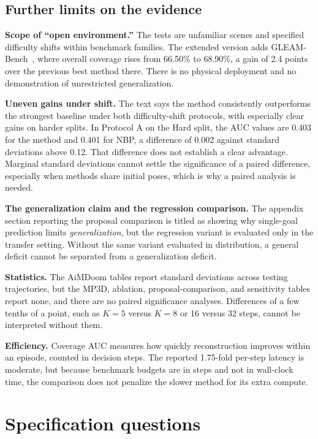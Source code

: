 \documentclass[11pt]{article}
\theoremstyle{plain}
\theoremstyle{remark}
\begin{document}
\subsection{Further limits on the evidence}

\textbf{Scope of ``open environment.''} The tests are unfamiliar scenes and specified difficulty shifts within benchmark families. The extended version adds GLEAM-Bench~\cite{gleam2025}, where overall coverage rises from 66.50\% to 68.90\%, a gain of 2.4 points over the previous best method there. There is no physical deployment and no demonstration of unrestricted generalization.

\textbf{Uneven gains under shift.} The text says the method consistently outperforms the strongest baseline under both difficulty-shift protocols, with especially clear gains on harder splits. In Protocol A on the Hard split, the AUC values are 0.403 for the method and 0.401 for NBP, a difference of 0.002 against standard deviations above 0.12. That difference does not establish a clear advantage. Marginal standard deviations cannot settle the significance of a paired difference, especially when methods share initial poses, which is why a paired analysis is needed.

\textbf{The generalization claim and the regression comparison.} The appendix section reporting the proposal comparison is titled as showing why single-goal prediction limits \emph{generalization}, but the regression variant is evaluated only in the transfer setting. Without the same variant evaluated in distribution, a general deficit cannot be separated from a generalization deficit.

\textbf{Statistics.} The AiMDoom tables report standard deviations across testing trajectories, but the MP3D, ablation, proposal-comparison, and sensitivity tables report none, and there are no paired significance analyses. Differences of a few tenths of a point, such as $K=5$ versus $K=8$ or 16 versus 32 steps, cannot be interpreted without them.

\textbf{Efficiency.} Coverage AUC measures how quickly reconstruction improves within an episode, counted in decision steps. The reported 1.75-fold per-step latency is moderate, but because benchmark budgets are in steps and not in wall-clock time, the comparison does not penalize the slower method for its extra compute.

\section{Specification questions}\label{sec:spec}
\end{document}
